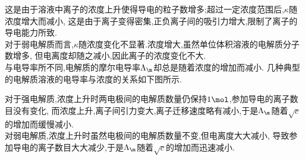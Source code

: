 \documentclass{ctexart}
\begin{document}
这是由于溶液中离子的浓度上升使得导电的粒子数增多;超过一定浓度范围后,$\kappa$随浓度增大而减小,%
这是由于离子变得密集,正负离子间的吸引力增大,限制了离子的导电能力所致.\\
\indent 对于弱电解质而言,$\kappa$随浓度变化不显著.浓度增大,虽然单位体积溶液的电解质分子数增多,%
但电离度却随之减小,因此离子的浓度变化不大.\\
\indent 与电导率所不同,电解质的摩尔电导率$\Lambda_\m$却总是随着浓度的增加而减小.%
几种典型的电解质溶液的电导率与浓度的关系如下图所示.
\begin{tightcenter}
    
\end{tightcenter}
对于强电解质,浓度上升时两电极间的电解质数量仍保持$1\mol$,参加导电的离子数目没有变化,%
而浓度上升,离子间引力变大,离子迁移速度略有减小,于是$\Lambda_\m$随着$\sqrt{c}$的增加而缓慢减小.\\
\indent 对弱电解质,浓度上升时虽然电极间的电解质数量不变,但电离度大大减小,
导致参加导电的离子数目大大减少,于是$\Lambda_\m$随着$\sqrt{c}$的增加而迅速减小.
\end{document}
